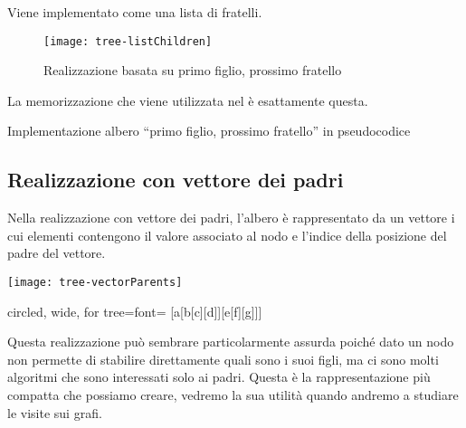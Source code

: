 Viene implementato come una lista di fratelli.

\begin{figure}[H]
	\centering
	\texttt{[image: tree-listChildren]}
	\caption[Realizzazione di un albero tramite primo figlio, prossimo fratello]{Realizzazione basata su primo figlio, prossimo fratello}
	\label{fig:tree-list-children}
\end{figure}

La memorizzazione che viene utilizzata nel  è esattamente questa.

\begin{algorithm}[H]
	\caption{Implementazione albero \enquote{primo figlio, prossimo fratello} in pseudocodice}
	
\end{algorithm}

\newpage
\subsection{Realizzazione con vettore dei padri}

Nella realizzazione con vettore dei padri, l'albero è rappresentato da un vettore i cui elementi contengono il valore associato al nodo e l'indice della posizione del padre del vettore.

\bigskip
\begin{minipage}[c]{.5\textwidth}
	\centering
	\texttt{[image: tree-vectorParents]}
\end{minipage}%
\begin{minipage}[c]{.5\textwidth}
	\centering
	\begin{forest} circled, wide, for tree={font=\scshape}
	[a[b[c][d]][e[f][g]]]
	\end{forest}
\end{minipage}

\bigskip
Questa realizzazione può sembrare particolarmente assurda poiché dato un nodo non permette di stabilire direttamente quali sono i suoi figli, ma ci sono molti algoritmi che sono interessati solo ai padri.
Questa è la rappresentazione più compatta che possiamo creare, vedremo la sua utilità quando andremo a studiare le visite sui grafi.

\ifsubfile

\fi
